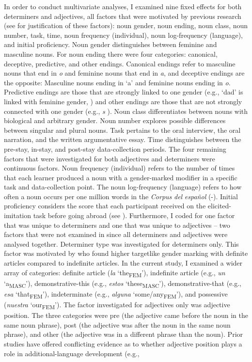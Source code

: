 \documentclass[output=paper,colorlinks,citecolor=brown,modfonts,nonflat]{../langscibook}
\begin{document}
In order to conduct multivariate analyses, I examined nine fixed effects for both determiners and adjectives, all factors that were motivated by previous research (see \citealt{GudmestadEtAl2019} for justification of these factors): noun gender, noun ending, noun class, noun number, task, time, noun frequency (individual), noun log-frequency (language), and initial proficiency. Noun gender distinguishes between feminine and masculine nouns. For noun ending there were four categories: canonical, deceptive, predictive, and other endings. Canonical endings refer to masculine nouns that end in \textit{o} and feminine nouns that end in \textit{a}, and deceptive endings are the opposite: Masculine nouns ending in ‘a’ and feminine nouns ending in \textit{o}. Predictive endings are those that are strongly linked to one gender (e.g., ‘dad’ is linked with feminine gender, \citealt{TeschnerRussell1984}) and other endings are those that are not strongly connected with one gender (e.g., \textit{s} \citealt{TeschnerRussell1984}). Noun class differentiates between nouns with biological and arbitrary gender. Noun number explores possible differences between singular and plural nouns. Task pertains to the oral interview, the oral narration, and the written argumentative essay. Time distinguishes between the pre-stay, in-stay, and post-stay data-collection periods. The four remaining factors that were investigated for both adjectives and determiners were continuous factors. Noun frequency (individual) refers to the number of times that each learner produced a noun with a gender-marked modifier in a specific task and data-collection point. The noun log-frequency (language) refers to how often a noun occurs per one million words in the \textit{Corpus} \textit{del} \textit{español} (\citealt{Davies2016}-). Initial proficiency considers the score that each participant received on the elicited-imitation task before going abroad (see ). Furthermore, I coded for one factor that was unique to determiners and one that was unique to adjectives – two factors that were not examined in \citeauthor{GudmestadEtAl2019} since all determiners and adjectives were analysed together. Determiner type was investigated for determiners only. This factor was motivated by \citet{GaravitoWhite2002} who found higher targetlike gender marking with definite articles compared to indefinite articles. In the current study, I examined a wider array of categories: definite article (\textit{la} ‘the\textsubscript{FEM}’), indefinite article (e.g., \textit{un} ‘a\textsubscript{MASC}’), demonstrative-this (e.g., \textit{estos} ‘these\textsubscript{MASC}’), demonstrative-that (e.g., \textit{esa} ‘that\textsubscript{FEM}’), indeterminate (e.g., \textit{alguna} ‘some/any\textsubscript{FEM}’), and possessive (\textit{nuestra} ‘our\textsubscript{FEM}’). The factor investigated for adjectives only was adjective position. The three categories were pre (the adjective came before the noun in the same noun phrase), post (the adjective was after the noun in the same noun phrase), and other (the adjective was in a different phrase than the noun). Prior studies have offered conflicting evidence as to whether adjective position plays a role in additional-language development (e.g., 
\end{document}
